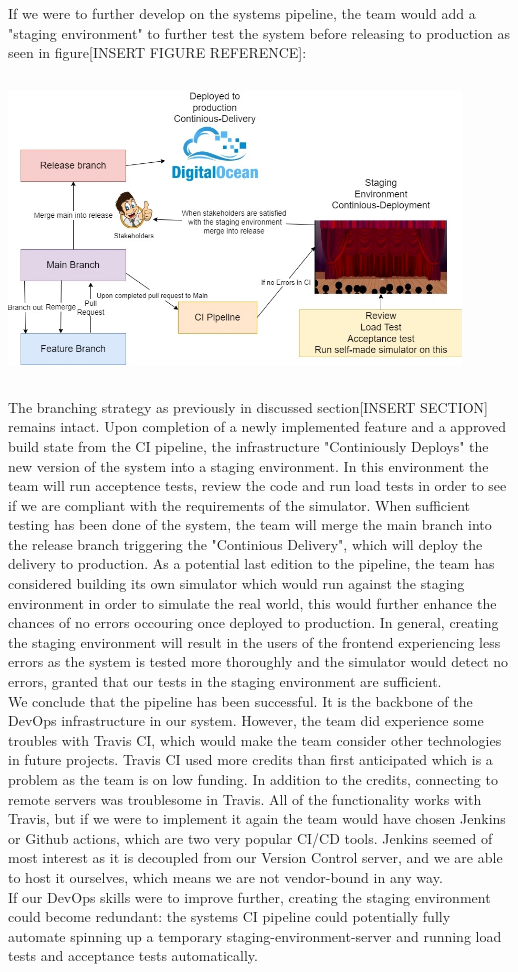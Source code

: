 If we were to further develop on the systems pipeline, the team would add a "staging environment" to further test the system before releasing to production as seen in figure[INSERT FIGURE REFERENCE]:

\begin{center}
\includegraphics[width=12cm, height=8cm]{images/image.PNG}
\end{center}

The branching strategy as previously in discussed section[INSERT SECTION] remains intact. Upon completion of a newly implemented feature and a approved build state from the CI pipeline, the infrastructure "Continiously Deploys" the new version of the system into a staging environment. In this environment the team will run acceptence tests, review the code and run load tests in order to see if we are compliant with the requirements of the simulator. When sufficient testing has been done of the system, the team will merge the main branch into the release branch triggering the "Continious Delivery", which will deploy the delivery to production. As a potential last edition to the pipeline, the team has considered building its own simulator which would run against the staging environment in order to simulate the real world, this would further enhance the chances of no errors occouring once deployed to production. In general, creating the staging environment will result in the users of the frontend experiencing less errors as the system is tested more thoroughly and the simulator would detect no errors, granted that our tests in the staging environment are sufficient.\\ 

We conclude that the pipeline has been successful. It is the backbone of the DevOps infrastructure in our system. However, the team did experience some troubles with Travis CI, which would make the team consider other technologies in future projects. Travis CI used more credits than first anticipated which is a problem as the team is on low funding. In addition to the credits, connecting to remote servers was troublesome in Travis. All of the functionality works with Travis, but if we were to implement it again the team would have chosen Jenkins or Github actions, which are two very popular CI/CD tools. Jenkins seemed of most interest as it is decoupled from our Version Control server, and we are able to host it ourselves, which means we are not vendor-bound in any way.\\

If our DevOps skills were to improve further, creating the staging environment could become redundant: the systems CI pipeline could potentially fully automate spinning up a temporary staging-environment-server and running load tests and acceptance tests automatically.